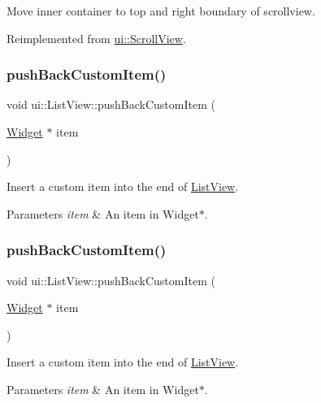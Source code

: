 Move inner container to top and right boundary of scrollview. 

Reimplemented from \hyperlink{classui_1_1ScrollView_ae2496521c218e2e53a364d98f223883b}{ui\+::\+Scroll\+View}.

\mbox{\label{classui_1_1ListView_afb0981c8954c749a31ca95d38b22de2a}} 
\subsubsection{\texorpdfstring{push\+Back\+Custom\+Item()}{pushBackCustomItem()}\hspace{0.1cm}{\footnotesize\ttfamily [1/2]}}
{\footnotesize\ttfamily void ui\+::\+List\+View\+::push\+Back\+Custom\+Item (\begin{DoxyParamCaption}\item[{\hyperlink{classui_1_1Widget}{Widget} $\ast$}]{item }\end{DoxyParamCaption})}

Insert a custom item into the end of \hyperlink{classui_1_1ListView}{List\+View}. 
\begin{DoxyParams}{Parameters}
{\em item} & An item in {\ttfamily Widget$\ast$}. \\
\hline
\end{DoxyParams}
\mbox{\label{classui_1_1ListView_afb0981c8954c749a31ca95d38b22de2a}} 
\subsubsection{\texorpdfstring{push\+Back\+Custom\+Item()}{pushBackCustomItem()}\hspace{0.1cm}{\footnotesize\ttfamily [2/2]}}
{\footnotesize\ttfamily void ui\+::\+List\+View\+::push\+Back\+Custom\+Item (\begin{DoxyParamCaption}\item[{\hyperlink{classui_1_1Widget}{Widget} $\ast$}]{item }\end{DoxyParamCaption})}

Insert a custom item into the end of \hyperlink{classui_1_1ListView}{List\+View}. 
\begin{DoxyParams}{Parameters}
{\em item} & An item in {\ttfamily Widget$\ast$}. \\
\hline
\end{DoxyParams}
\mbox{\label{classui_1_1ListView_a9ef7771758b5ffa248ac88d3bff471fe}} 
